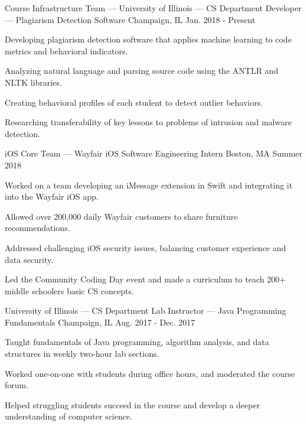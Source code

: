 
\begin{cventries}
\cventry
{Course Infrastructure Team — University of Illinois — CS Department} %
{Developer — Plagiarism Detection Software} %
{Champaign, IL} %
{Jan. 2018 - Present} %
{
	\begin{cvitems} %
		\item {Developing plagiarism detection software that applies machine learning to code metrics and behavioral indicators.}
		\item {Analyzing natural language and parsing source code using the ANTLR and NLTK libraries.}
		\item {Creating behavioral profiles of each student to detect outlier behaviors.}
		\item {Researching transferability of key lessons to problems of intrusion and malware detection.}
	\end{cvitems}
}
\cventry
{iOS Core Team — Wayfair} %
{iOS Software Engineering Intern} %
{Boston, MA} %
{Summer 2018} %
{
	\begin{cvitems} %
		\item {Worked on a team developing an iMessage extension in Swift and integrating it into the Wayfair iOS app.}
		\item {Allowed over 200,000 daily Wayfair customers to share furniture recommendations.}
		\item {Addressed challenging iOS security issues, balancing customer experience and data security.}
		\item {Led the Community Coding Day event and made a curriculum to teach 200+ middle schoolers basic CS concepts.}
	\end{cvitems}
}
\cventry
{University of Illinois — CS Department} %
{Lab Instructor — Java Programming Fundamentals} %
{Champaign, IL} %
{Aug. 2017 - Dec. 2017} %
{
	\begin{cvitems} %
		\item {Taught fundamentals of Java programming, algorithm analysis, and data structures in weekly two-hour lab sections.}
		\item {Worked one-on-one with students during office hours, and moderated the course forum.}
		\item {Helped struggling students succeed in the course and develop a deeper understanding of computer science.}
	\end{cvitems}
}
\end{cventries}
